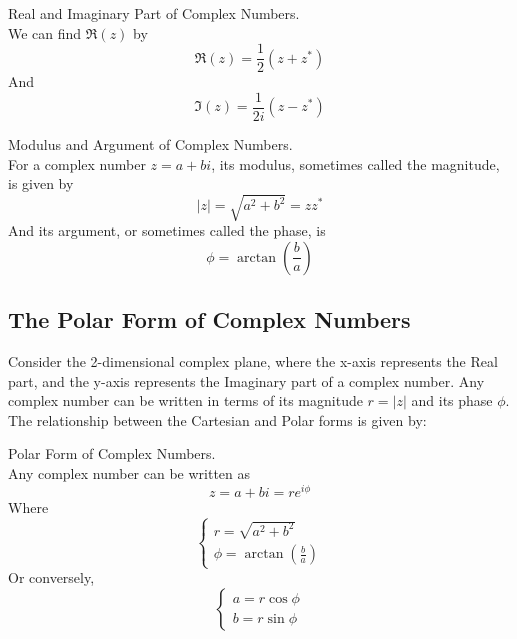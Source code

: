\documentclass[11pt]{article}
\theoremstyle{gangnamstyle}{\newtheorem{definition}{Definition}[]}
\theoremstyle{gangnamstyle}{\newtheorem{example}{Example}[]}
\theoremstyle{gangnamstyle}{\newtheorem{problem}{Problem}[]}
\begin{document}
\begin{definition}
Real and Imaginary Part of Complex Numbers. \\
We can find $\Re(z)$ by 
\begin{equation}
\Re(z) = \frac{1}{2}(z + z^*)
\end{equation}
And
\begin{equation}
\Im(z) = \frac{1}{2i}(z - z^*)
\end{equation}
\end{definition}
\begin{definition}
Modulus and Argument of Complex Numbers. \\
For a complex number $z = a + bi$, its modulus, sometimes called the magnitude, is given by
\begin{equation}
|z| = \sqrt{a^2 + b^2} = zz^*
\end{equation}
And its argument, or sometimes called the phase, is
\begin{equation}
\phi = \arctan(\frac{b}{a})
\end{equation}
\end{definition}

\subsection{The Polar Form of Complex Numbers}

Consider the 2-dimensional complex plane, where the x-axis represents the Real part, and the y-axis represents the Imaginary part of a complex number. Any complex number can be written in terms of its magnitude $r = |z|$ and its phase $\phi$. The relationship between the Cartesian and Polar forms is given by: 

\begin{definition}
Polar Form of Complex Numbers. \\
Any complex number can be written as
\begin{equation}
z = a + bi = re^{i\phi}
\end{equation}
Where
\begin{equation}
\begin{cases}
r = \sqrt{a^2 + b^2} \\
\phi = \arctan(\frac{b}{a})
\end{cases}
\end{equation}
Or conversely, 
\begin{equation}
\begin{cases}
a = r \cos\phi \\
b = r\sin\phi
\end{cases}
\end{equation}
\end{definition}
\end{document}
